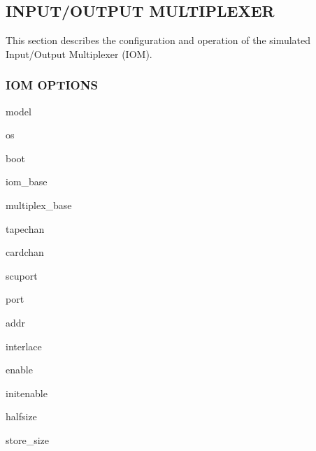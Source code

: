 \subsection[Input/Output Multiplexer (IOM)]{INPUT/OUTPUT MULTIPLEXER}

This section describes the configuration and operation of the simulated Input/Output Multiplexer (IOM).

\subsubsection[IOM Options]{IOM OPTIONS}

model

os

boot

iom\_base

multiplex\_base

tapechan

cardchan

scuport

port

addr

interlace

enable

initenable

halfsize

store\_size